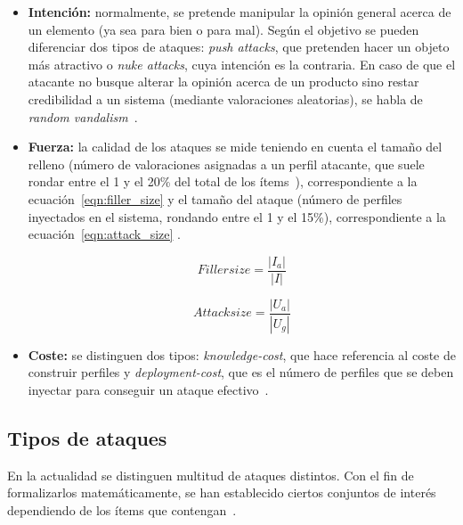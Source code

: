 \begin{itemize}
	
	\item \textbf{Intención:} normalmente, se pretende manipular la opinión general acerca de un elemento (ya sea para bien o para mal). Según el objetivo se pueden diferenciar dos tipos de ataques: \textit{push attacks}, que pretenden hacer un objeto más atractivo o \textit{nuke attacks}, cuya intención es la contraria. En caso de que el atacante no busque alterar la opinión acerca de un producto sino restar credibilidad a un sistema (mediante valoraciones aleatorias), se habla de \textit{random vandalism}~\cite{Burke2015RobustCollaborative}.
	
	\item \textbf{Fuerza:} la calidad de los ataques se mide teniendo en cuenta el tamaño del relleno (número de valoraciones asignadas a un perfil atacante, que suele rondar entre el 1 y el 20\% del total de los ítems~\cite{mingdan2018ShillingAttacksAReview}), correspondiente a la ecuación~\ref{eqn:filler_size}  y el tamaño del ataque (número de perfiles inyectados en el sistema, rondando entre el 1 y el 15\%), correspondiente a la ecuación~\ref{eqn:attack_size} .
	
	\begin{equation}\label{eqn:filler_size} Filler size = \frac{|I_a|}{|I|}\end{equation}
	
	\begin{equation}\label{eqn:attack_size} Attack size = \frac{|U_a|}{|U_g|}\end{equation}
	
	\item \textbf{Coste:} se distinguen dos tipos: \textit{knowledge-cost}, que hace referencia al coste de construir perfiles y \textit{deployment-cost}, que es el número de perfiles que se deben inyectar para conseguir un ataque efectivo~\cite{Mobasher2006Thesis}.
	
\end{itemize}

\subsection{Tipos de ataques}

En la actualidad se distinguen multitud de ataques distintos. Con el fin de formalizarlos matemáticamente, se han establecido ciertos conjuntos de interés dependiendo de los ítems que contengan~\cite{zhou2021SemisupervisedRecommendationAttack}.

